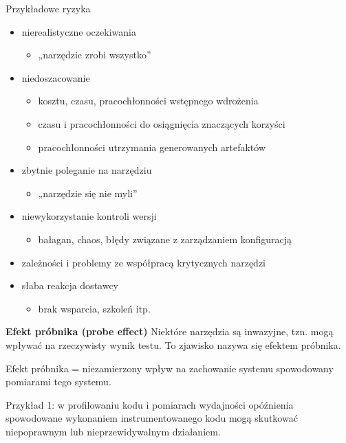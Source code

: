 \documentclass[../main.tex]{subfiles}
\begin{document}
    Przykładowe ryzyka
    \begin{itemize}
        \item nierealistyczne oczekiwania
        \begin{itemize}
            \item „narzędzie zrobi wszystko”
        \end{itemize}
        \item niedoszacowanie
        \begin{itemize}
            \item kosztu, czasu, pracochłonności wstępnego wdrożenia
            \item czasu i pracochłonności do osiągnięcia znaczących korzyści
            \item pracochłonności utrzymania generowanych artefaktów
        \end{itemize}
        \item zbytnie poleganie na narzędziu
        \begin{itemize}
            \item „narzędzie się nie myli”
        \end{itemize}
        \item niewykorzystanie kontroli wersji
        \begin{itemize}
            \item bałagan, chaos, błędy związane z zarządzaniem konfiguracją
        \end{itemize}
        \item zależności i problemy ze współpracą krytycznych narzędzi
        \item słaba reakcja dostawcy
        \begin{itemize}
            \item brak wsparcia, szkoleń itp.
        \end{itemize}
    \end{itemize}


    \textbf{Efekt próbnika (probe effect)}
    Niektóre narzędzia są inwazyjne, tzn. mogą wpływać na rzeczywisty wynik testu. To zjawisko nazywa się
    efektem próbnika.

    Efekt próbnika = niezamierzony wpływ na zachowanie systemu spowodowany pomiarami tego systemu.

    Przykład 1: w profilowaniu kodu i pomiarach wydajności opóźnienia spowodowane wykonaniem
    instrumentowanego kodu mogą skutkować niepoprawnym lub nieprzewidywalnym działaniem.
\end{document}
